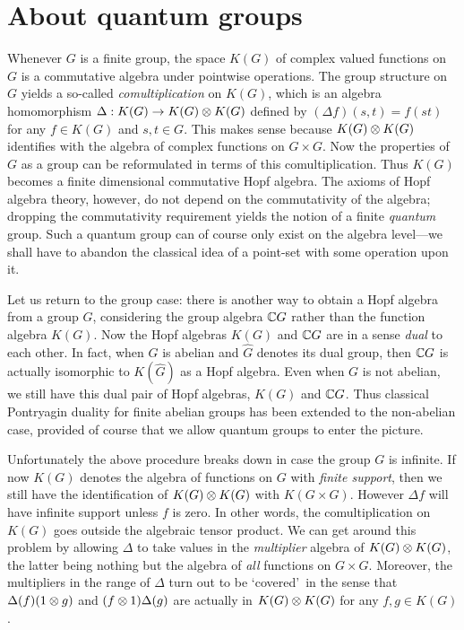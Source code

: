 \section{About quantum groups}

Whenever $G$ is a finite group, the space $K(G)$ of complex valued functions on $G$
is a commutative algebra under pointwise operations.
The group structure on $G$ yields a so-called {\em comultiplication\/} on $K(G)$,
which is an algebra homomorphism $\Delta : K(G) \rightarrow K(G) \otimes K(G)$
defined by $(\Delta f)(s,t)=f(st)$ for any $f\in K(G)$ and $s,t \in G$.
This makes sense because $K(G) \otimes K(G)$ identifies with the algebra of complex
functions on $G \times G$.
Now the properties of $G$ as a group can be reformulated in terms of this comultiplication.
Thus $K(G)$ becomes a finite dimensional commutative Hopf algebra.
The axioms of Hopf algebra theory, however, do not depend on the commutativity
of the algebra; dropping the commutativity requirement yields the notion of
a finite {\em quantum\/} group.
Such a quantum group can of course only exist on the algebra level---we shall have
to abandon the classical idea of a point-set with some operation upon it.
\vspace{1ex}

Let us return to the group case: there is another way to obtain a
Hopf algebra from a group $G$, considering the group algebra $\mathbb{C} G$
rather than the function algebra $K(G)$.
Now the Hopf algebras $K(G)$ and $\mathbb{C} G$ are in a sense {\em dual\/} to each other.
In fact, when $G$ is abelian and $\hat{G}$ denotes its dual group,
then $\mathbb{C} G$ is actually isomorphic to $K(\hat{G})$ as a Hopf algebra.
Even when $G$ is not abelian, we still have this dual pair of Hopf algebras,
$K(G)$ and $\mathbb{C} G$. Thus classical Pontryagin duality for finite abelian groups
has been extended to the non-abelian case, provided of course that we allow
quantum groups to enter the picture.
\vspace{1ex}

Unfortunately the above procedure breaks down in case the group $G$ is infinite.
If now $K(G)$ denotes the algebra of functions on $G$ with {\em finite support},
then we still have the identification of $K(G) \otimes K(G)$ with $K(G \times G)$.
However $\Delta f$ will have infinite support unless $f$ is zero.
In other words, the comultiplication on $K(G)$ goes outside the algebraic tensor product.
We can get around this problem by allowing $\Delta$ to take values in the
{\em multiplier\/} algebra of $K(G) \otimes K(G)$, the latter being
nothing but the algebra of {\em all\/} functions on $G \times G$.
Moreover, the multipliers in the range of $\Delta$ turn out to be \lq covered\rq\
in the sense that $\Delta(f)(1 \otimes g)$ and $(f \otimes 1)\Delta(g)$
are actually in $K(G) \otimes K(G)$ for any $f,g \in K(G)$.
\vspace{1pt}


